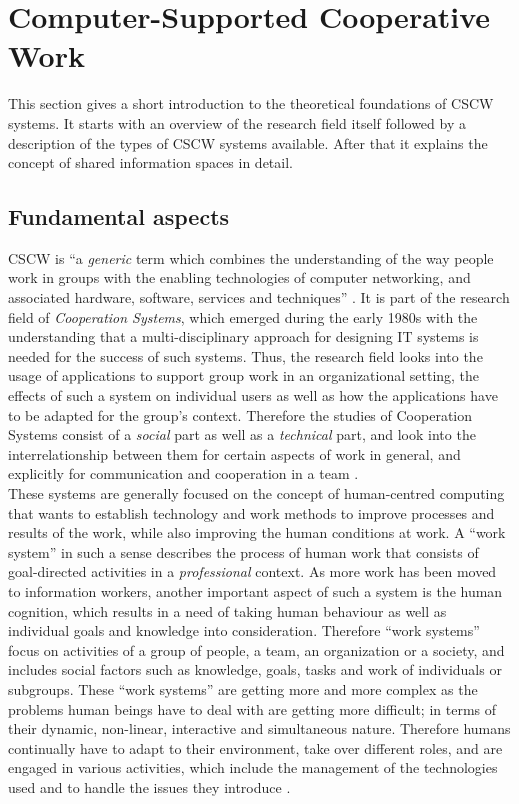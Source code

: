 
\section{Computer-Supported Cooperative Work}
\label{sec:cscw}

This section gives a short introduction to the theoretical foundations of \gls{CSCW} systems. It starts with an overview of the research field itself followed by a description of the types of \gls{CSCW} systems available. After that it explains the concept of shared information spaces in detail.

\subsection{Fundamental aspects}
\label{sec:cscw_definition}

\gls{CSCW} is ``a \emph{generic} term which combines the understanding of the way people work in groups with the enabling technologies of computer networking, and associated hardware, software, services and techniques'' \citep[pg. 92]{borghoff2000computer}. It is part of the research field of \emph{Cooperation Systems}, which emerged during the early 1980s with the understanding that a multi-disciplinary approach for designing \gls{IT} systems is needed for the success of such systems. Thus, the research field looks into the usage of applications to support group work in an organizational setting, the effects of such a system on individual users as well as how the applications have to be adapted for the group's context. Therefore the studies of Cooperation Systems consist of a \emph{social} part as well as a \emph{technical} part, and look into the interrelationship between them for certain aspects of work in general, and explicitly for communication and cooperation in a team \citep{Grudin1994}. \\

These systems are generally focused on the concept of human-centred computing that wants to establish technology and work methods to improve processes and results of the work, while also improving the human conditions at work. A ``work system'' in such a sense describes the process of human work that consists of goal-directed activities in a \emph{professional} context. As more work has been moved to information workers, another important aspect of such a system is the human cognition, which results in a need of taking human behaviour as well as individual goals and knowledge into consideration. Therefore ``work systems'' focus on activities of a group of people, a team, an organization or a society, and includes social factors such as knowledge, goals, tasks and work of individuals or subgroups. These ``work systems'' are getting more and more complex as the problems human beings have to deal with are getting more difficult; in terms of their dynamic, non-linear, interactive and simultaneous nature. Therefore humans continually have to adapt to their environment, take over different roles, and are engaged in various activities, which include the management of the technologies used and to handle the issues they introduce \citep{Hoffmann2009}. \\

